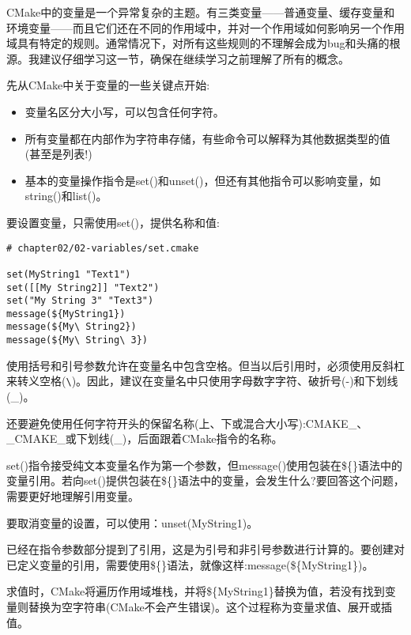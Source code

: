 
CMake中的变量是一个异常复杂的主题。有三类变量——普通变量、缓存变量和环境变量——而且它们还在不同的作用域中，并对一个作用域如何影响另一个作用域具有特定的规则。通常情况下，对所有这些规则的不理解会成为bug和头痛的根源。我建议仔细学习这一节，确保在继续学习之前理解了所有的概念。

先从CMake中关于变量的一些关键点开始:

\begin{itemize}
\item 
变量名区分大小写，可以包含任何字符。

\item 
所有变量都在内部作为字符串存储，有些命令可以解释为其他数据类型的值(甚至是列表!)

\item 
基本的变量操作指令是set()和unset()，但还有其他指令可以影响变量，如string()和list()。
\end{itemize}

要设置变量，只需使用set()，提供名称和值:

\begin{lstlisting}[style=styleCMake]
# chapter02/02-variables/set.cmake

set(MyString1 "Text1")
set([[My String2]] "Text2")
set("My String 3" "Text3")
message(${MyString1})
message(${My\ String2})
message(${My\ String\ 3})
\end{lstlisting}

使用括号和引号参数允许在变量名中包含空格。但当以后引用时，必须使用反斜杠来转义空格(\verb|\|)。因此，建议在变量名中只使用字母数字字符、破折号(-)和下划线(\_)。

还要避免使用任何字符开头的保留名称(上、下或混合大小写):CMAKE\_、\_CMAKE\_或下划线(\_)，后面跟着CMake指令的名称。

\begin{tcolorbox}[colback=blue!5!white,colframe=blue!75!black,title=Note]
set()指令接受纯文本变量名作为第一个参数，但message()使用包装在\$\{\}语法中的变量引用。若向set()提供包装在\$\{\}语法中的变量，会发生什么?要回答这个问题，需要更好地理解引用变量。
\end{tcolorbox}

要取消变量的设置，可以使用：unset(MyString1)。


已经在指令参数部分提到了引用，这是为引号和非引号参数进行计算的。要创建对已定义变量的引用，需要使用\$\{\}语法，就像这样:message(\$\{MyString1\})。

求值时，CMake将遍历作用域堆栈，并将\$\{MyString1\}替换为值，若没有找到变量则替换为空字符串(CMake不会产生错误)。这个过程称为变量求值、展开或插值。

